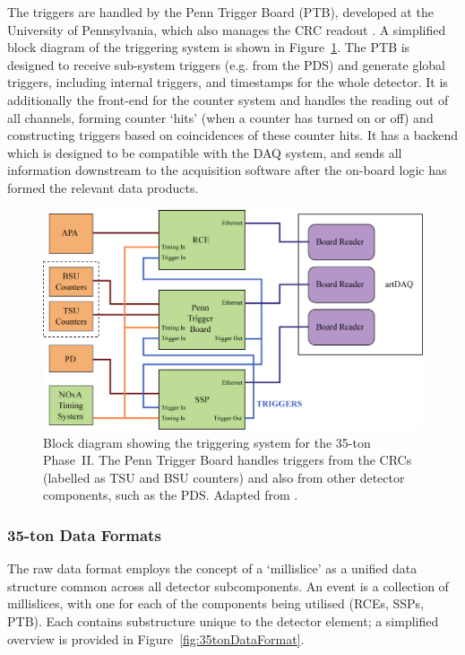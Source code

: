 The triggers are handled by the Penn Trigger Board (PTB), developed at the University of Pennsylvania, which also manages the CRC readout \cite{Barros2016}.  A simplified block diagram of the triggering system is shown in Figure~\ref{fig:35tonTriggering}.  The PTB is designed to receive sub-system triggers (e.g. from the PDS) and generate global triggers, including internal triggers, and timestamps for the whole detector.  It is additionally the front-end for the counter system and handles the reading out of all channels, forming counter `hits' (when a counter has turned on or off) and constructing triggers based on coincidences of these counter hits.  It has a backend which is designed to be compatible with the DAQ system, and sends all information downstream to the acquisition software after the on-board logic has formed the relevant data products.

\begin{figure}
  \centering
  \includegraphics[width=12cm]{trigger_system.eps}
  \caption[Block diagram showing the triggering system for the 35-ton Phase~II.]{Block diagram showing the triggering system for the 35-ton Phase~II.  The Penn Trigger Board handles triggers from the CRCs (labelled as TSU and BSU counters) and also from other detector components, such as the PDS.  Adapted from \cite{Barros2016}.}
  \label{fig:35tonTriggering}
\end{figure}

\subsubsection{35-ton Data Formats}\label{sec:35tonDataFormats}

The raw data format employs the concept of a `millislice' as a unified data structure common across all detector subcomponents.  An event is a collection of millislices, with one for each of the components being utilised (RCEs, SSPs, PTB).  Each contains substructure unique to the detector element; a simplified overview is provided in Figure~\ref{fig:35tonDataFormat}.

